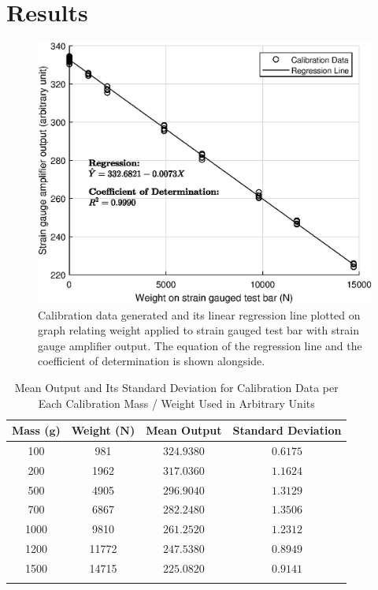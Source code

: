 \documentclass[conference, letterpaper]{IEEEtran}
\begin{document}
\section{Results}
    \vspace*{-\baselineskip}
    \begin{figure}[htbp]
    \centerline{\includegraphics[width = \linewidth]{lab1fig.eps}}
    \caption{Calibration data generated and its linear regression line plotted on graph relating weight applied to strain gauged test bar with strain gauge amplifier output. The equation of the regression line and the coefficient of determination is shown alongside.}\label{fig}
    \end{figure}
    \vspace*{-\baselineskip}
    \begin{table}[htbp]
        \caption{Mean Output and Its Standard Deviation for Calibration Data per Each Calibration Mass / Weight Used in Arbitrary Units}
        \centering
        \begin{tabular}{cccc}
            \toprule{}
            \textbf{Mass (\(\bm{g}\))} & \textbf{Weight (\(\bm{N}\))} & \textbf{Mean Output} & \textbf{Standard Deviation}\\
            \midrule{}
            100 & 981 & \(324.9380\) & \(0.6175\) \\
            200 & 1962 & \(317.0360\) & \(1.1624\) \\
            500 & 4905 & \(296.9040\) & \(1.3129\) \\
            700 & 6867 & \(282.2480\) & \(1.3506\) \\
            1000 & 9810 & \(261.2520\) & \(1.2312\) \\
            1200 & 11772 & \(247.5380\) & \(0.8949\) \\
            1500 & 14715 & \(225.0820\) & \(0.9141\) \\
            \bottomrule{}
        \end{tabular}\label{tab1}
    \end{table}
    \vspace*{-\baselineskip}
\end{document}
